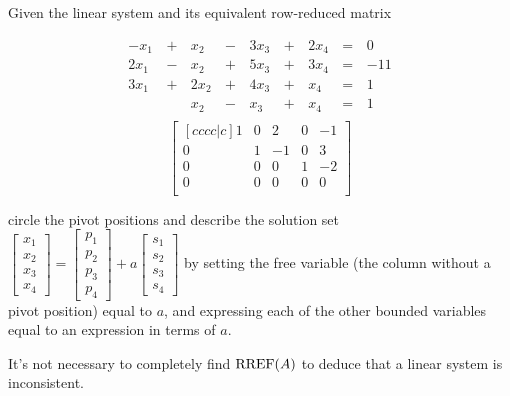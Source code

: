 \begin{applicationActivities}{3}{6}
\begin{activity}{10}
  Given the linear system and its equivalent row-reduced matrix
  \begin{multicols}{2}\noindent
    \begin{alignat*}{5}
      -x_1 &\,+\,&  x_2 &\,-\,&  3x_3 &\,+\,&  2x_4 &\,=\,& 0 \\
      2x_1 &\,-\,&  x_2 &\,+\,&  5x_3 &\,+\,&  3x_4 &\,=\,& -11 \\
      3x_1 &\,+\,& 2x_2 &\,+\,&  4x_3 &\,+\,&   x_4 &\,=\,& 1 \\
           &\, \,&  x_2 &\,-\,&   x_3 &\,+\,&   x_4 &\,=\,& 1 \\
    \end{alignat*}
  \[
    \begin{bmatrix}[cccc|c]
       1 &  0 &  2 &  0 & -1 \\
       0 &  1 & -1 &  0 &  3 \\
       0 &  0 &  0 &  1 & -2 \\
       0 &  0 &  0 &  0 &  0 \\
    \end{bmatrix}
  \]
  \end{multicols}
  circle the pivot positions and describe the solution set
  \(
    \begin{bmatrix}
      x_1 \\
      x_2 \\
      x_3 \\
      x_4
    \end{bmatrix}=
    \begin{bmatrix}
      p_1 \\
      p_2 \\
      p_3 \\
      p_4
    \end{bmatrix}
    +a\begin{bmatrix}
      s_1 \\
      s_2 \\
      s_3 \\
      s_4
    \end{bmatrix}
  \) by setting the free variable (the column without a pivot position)
  equal to \(a\), and expressing each of the other
  bounded variables equal to an expression in terms of \(a\).
\end{activity}

\begin{remark}
  It's not necessary to completely find \(\operatorname{RREF}(A)\) to
  deduce that a linear system is inconsistent.
\end{remark}


\end{applicationActivities}
